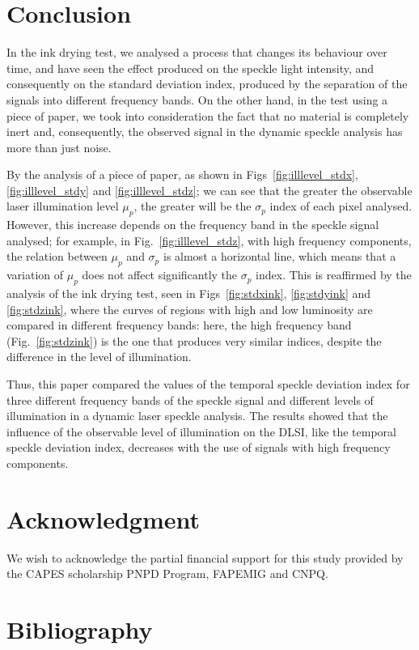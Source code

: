 \documentclass[review]{elsarticle}
\begin{document}
\section{Conclusion} 

In the ink drying test, 
we analysed a process that changes its behaviour over time,
and have seen the effect produced on  the speckle light intensity, 
and consequently on the standard deviation index, 
produced by the separation of the signals into different frequency bands.
On the other hand, in the test using a piece of paper, 
we took into consideration the fact that no material is completely inert and, consequently, 
the observed signal  in the  dynamic speckle analysis has more than just noise.

By the analysis of a piece of paper, as shown in Figs~\ref{fig:illlevel_stdx}, \ref{fig:illlevel_stdy} and \ref{fig:illlevel_stdz};
we can see that the greater the observable laser illumination level $\mu_p$, 
the greater will be the $\sigma_p$ index of each pixel analysed. 
However, this increase depends on the frequency band in the speckle signal  analysed;
for example, in Fig.~\ref{fig:illlevel_stdz},
with high frequency components, the relation between $\mu_p$ and $\sigma_p$ is almost a horizontal line, 
which means that a variation of $\mu_p$ does not affect significantly the $\sigma_p$ index.
This is reaffirmed by the analysis of the ink drying test, 
seen in Figs~\ref{fig:stdxink}, \ref{fig:stdyink} and \ref{fig:stdzink},
where the curves of regions with high and low luminosity are compared in different frequency bands:
here, the high frequency band  (Fig.~\ref{fig:stdzink}) 
is the one that produces very similar indices, despite the difference in the level of illumination.

Thus, this paper compared the values of the temporal 
speckle deviation index for three different frequency bands of the speckle signal and 
different levels of illumination in a dynamic laser speckle analysis.
The results showed that the influence of the observable level of illumination on the DLSI, 
like the temporal speckle deviation index, 
decreases with the use of signals with high frequency components.

\section{Acknowledgment}
We wish to acknowledge the partial financial support for this study provided by the CAPES
scholarship
PNPD Program, FAPEMIG and CNPQ.

\section{Bibliography}


\end{document}
